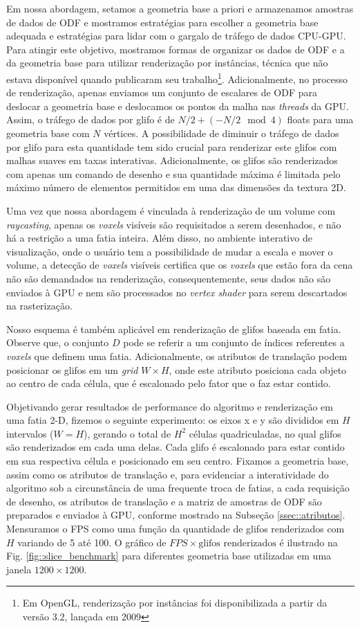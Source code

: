 \documentclass[
    12pt,                %
    oneside,            %
    a4paper,            %
    english,            %
    french,                %
    spanish,            %
    brazil                %
    ]{abntex2}
\begin{document}
Em nossa abordagem, setamos a geometria base a priori e armazenamos amostras de dados de ODF e mostramos estratégias para escolher a geometria base adequada e estratégias para lidar com o gargalo de tráfego de dados CPU-GPU. Para atingir este objetivo, mostramos formas de organizar os dados de ODF e a da geometria base para utilizar renderização por instâncias, técnica que não estava disponível quando  publicaram seu trabalho\footnote{Em OpenGL, renderização por instâncias foi disponibilizada a partir da versão 3.2, lançada em 2009}. Adicionalmente, no processo de renderização, apenas enviamos um conjunto de escalares de ODF para deslocar a geometria base e deslocamos os pontos da malha nas \textit{threads} da GPU. Assim, o tráfego de dados por glifo é de $N/2 + (-N/2 \mod{4})$ floats para uma geometria base com $N$ vértices. A possibilidade de diminuir o tráfego de dados por glifo para esta quantidade tem sido crucial para renderizar este glifos com malhas suaves em taxas interativas. Adicionalmente, os glifos são renderizados com apenas um comando de desenho e sua quantidade máxima é limitada pelo máximo número de elementos permitidos em uma das dimensões da textura 2D.

Uma vez que nossa abordagem é vinculada à renderização de um volume com \textit{raycasting}, apenas os \textit{voxels} visíveis são requisitados a serem desenhados, e não há a restrição a uma fatia inteira. Além disso, no ambiente interativo de visualização, onde o usuário tem a possibilidade de mudar a escala e mover o volume, a detecção de \textit{voxels} visíveis certifica que os \textit{voxels} que estão fora da cena não são demandados na renderização, consequentemente, seus dados não são enviados à GPU e nem são processados no \textit{vertex shader} para serem descartados na rasterização.

Nosso esquema é também aplicável em renderização de glifos baseada em fatia. Observe que, o conjunto $D$ pode se referir a um conjunto de índices referentes a \textit{voxels} que definem uma fatia. Adicionalmente, os atributos de translação podem posicionar os glifos em um \textit{grid} $W \times H$, onde este atributo posiciona cada objeto ao centro de cada célula, que é escalonado pelo fator que o faz estar contido.

Objetivando gerar resultados de performance do algoritmo e renderização em uma fatia 2-D, fizemos o seguinte experimento: os eixos x e y são divididos em $H$ intervalos ($W = H$), gerando o total de $H^2$ células quadriculadas, no qual glifos são renderizados em cada uma delas. Cada glifo é escalonado para estar contido em sua respectiva célula e posicionado em seu centro. Fixamos a geometria base, assim como os atributos de translação e, para evidenciar a interatividade do algoritmo sob a circunstância de uma frequente troca de fatias, a cada requisição de desenho, os atributos de translação e a matriz de amostras de ODF são preparados e enviados à GPU, conforme mostrado na Subseção \ref{ssec::atributos}. Mensuramos o FPS como uma função da quantidade de glifos renderizados com $H$ variando de 5 até 100. O gráfico de $FPS \times \text{glifos renderizados}$ é ilustrado na Fig. \ref{fig::slice_benchmark} para diferentes geometria base utilizadas em uma janela $1200\times 1200$.
\end{document}
